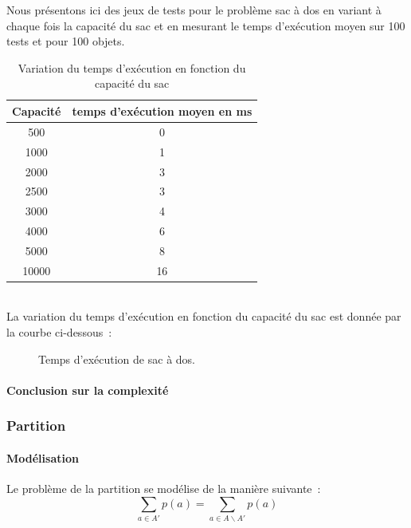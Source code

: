\documentclass[a4paper, 12pt]{article}
\begin{document}
Nous présentons ici des jeux de tests pour le problème sac à dos en variant à chaque fois la capacité du sac et en mesurant le temps d'exécution moyen sur 100 tests et pour 100 objets.
\begin{table}[h!]
\centering
\begin{tabular}{|c|c|}
\hline
Capacité & temps d'exécution moyen en ms\\
\hline
500 & 0\\
\hline
1000 & 1\\
\hline
2000 & 3\\
\hline
2500 & 3\\
\hline
3000 & 4\\
\hline
4000 & 6\\
\hline
5000 & 8\\
\hline
10000 & 16\\
\hline
\end{tabular}
\caption {Variation du temps d'exécution en fonction du capacité du sac}
\end{table}\\
La variation du temps d'exécution en fonction du capacité du sac est donnée par la courbe ci-dessous~:
\begin{figure}[h!]
\centering
{}
\caption{Temps d'exécution de sac à dos.}
\end{figure}

\paragraph{Conclusion sur la complexité}

\subsubsection{Partition}

\paragraph{Modélisation}

Le problème de la partition se modélise de la manière suivante~:
\begin{equation}
\sum_{a \in A'} p(a)= \sum_{a \in A
    \backslash A'}p(a)
\end{equation}
\end{document}
